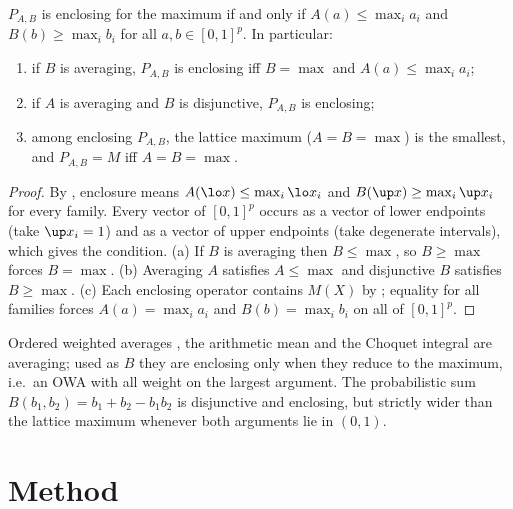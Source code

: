 \begin{theorem}\label{thm:agg}
$P_{A,B}$ is enclosing for the maximum if and only if $A(a)\le\max_ia_i$ and $B(b)\ge\max_ib_i$ for all $a,b\in[0,1]^p$. In particular:
\begin{enumerate}[label=(\alph*)]
\item if $B$ is averaging, $P_{A,B}$ is enclosing iff $B=\max$ and $A(a)\le\max_ia_i$;
\item if $A$ is averaging and $B$ is disjunctive, $P_{A,B}$ is enclosing;
\item among enclosing $P_{A,B}$, the lattice maximum ($A=B=\max$) is the smallest, and $P_{A,B}=M$ iff $A=B=\max$.
\end{enumerate}
\end{theorem}

\begin{proof}
By , enclosure means $A(\lo x)\le\max_i\lo x_i$ and $B(\up x)\ge\max_i\up x_i$ for every family. Every vector of $[0,1]^p$ occurs as a vector of lower endpoints (take $\up x_i=1$) and as a vector of upper endpoints (take degenerate intervals), which gives the condition. (a) If $B$ is averaging then $B\le\max$, so $B\ge\max$ forces $B=\max$. (b) Averaging $A$ satisfies $A\le\max$ and disjunctive $B$ satisfies $B\ge\max$. (c) Each enclosing operator contains $M(X)$ by ; equality for all families forces $A(a)=\max_ia_i$ and $B(b)=\max_ib_i$ on all of $[0,1]^p$.
\end{proof}

\begin{example}
Ordered weighted averages \cite{forcen2020}, the arithmetic mean and the Choquet integral \cite{bustince2013choquet} are averaging; used as $B$ they are enclosing only when they reduce to the maximum, i.e.\ an OWA with all weight on the largest argument. The probabilistic sum $B(b_1,b_2)=b_1+b_2-b_1b_2$ is disjunctive and enclosing, but strictly wider than the lattice maximum whenever both arguments lie in $(0,1)$.
\end{example}


\section{Method}
\label{sec:method}

